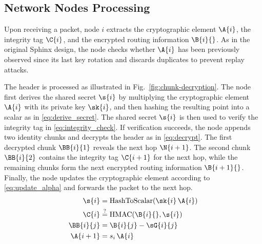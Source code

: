 \subsection{Network Nodes Processing}
Upon receiving a packet, node $i$ extracts the cryptographic element $\A{i}$, the integrity tag $\C{i}$, and the encrypted routing information $\B{i}{}$. 
As in the original Sphinx design, the node checks whether $\A{i}$ has been previously observed since its last key rotation and discards duplicates to prevent replay attacks.

The header is processed as illustrated in Fig.~\ref{fig:chunk-decryption}.
The node first derives the shared secret $\s{i}$ by multiplying the cryptographic element $\A{i}$ with its private key $\sk{i}$, and then hashing the resulting point into a scalar as in \eqref{eq:derive_secret}.
The shared secret $\s{i}$ is then used to verify the integrity tag in \eqref{eq:integrity_check}.
If verification succeeds, the node appends two identity chunks and decrypts the header as in \eqref{eq:decrypt}. 
The first decrypted chunk $\BB{i}{1}$ reveals the next hop $\N{i+1}$. 
The second chunk $\BB{i}{2}$ contains the integrity tag $\C{i+1}$ for the next hop, while the remaining chunks form the next encrypted routing information $\B{i+1}{}$.
Finally, the node updates the cryptographic element according to \eqref{eq:update_alpha} and forwards the packet to the next hop.
\begin{align}
    \s{i}     &=                     \text{HashToScalar}\!\left(\sk{i} \, \A{i}\right)  \label{eq:derive_secret} \\
    \C{i}     &\overset{\text{?}}{=} \text{HMAC}\!\left(\B{i}{}, \s{i}\right)           \label{eq:integrity_check} \\
    \BB{i}{j} &=                     \B{i}{j} - \sG{i}{j}                               \label{eq:decrypt} \\
    \A{i+1}   &=                     s_i \, \A{i}                                       \label{eq:update_alpha} 
\end{align}